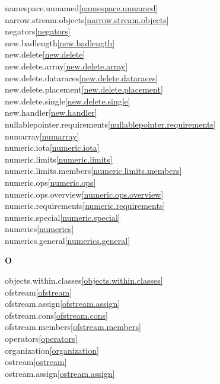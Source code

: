 \begin{multicols}{2}
namespace.unnamed\quad\ref{namespace.unnamed}\\
narrow.stream.objects\quad\ref{narrow.stream.objects}\\
negators\quad\ref{negators}\\
new.badlength\quad\ref{new.badlength}\\
new.delete\quad\ref{new.delete}\\
new.delete.array\quad\ref{new.delete.array}\\
new.delete.dataraces\quad\ref{new.delete.dataraces}\\
new.delete.placement\quad\ref{new.delete.placement}\\
new.delete.single\quad\ref{new.delete.single}\\
new.handler\quad\ref{new.handler}\\
nullablepointer.requirements\quad\ref{nullablepointer.requirements}\\
numarray\quad\ref{numarray}\\
numeric.iota\quad\ref{numeric.iota}\\
numeric.limits\quad\ref{numeric.limits}\\
numeric.limits.members\quad\ref{numeric.limits.members}\\
numeric.ops\quad\ref{numeric.ops}\\
numeric.ops.overview\quad\ref{numeric.ops.overview}\\
numeric.requirements\quad\ref{numeric.requirements}\\
numeric.special\quad\ref{numeric.special}\\
numerics\quad\ref{numerics}\\
numerics.general\quad\ref{numerics.general}\\
\par \textbf{O}\par
objects.within.classes\quad\ref{objects.within.classes}\\
ofstream\quad\ref{ofstream}\\
ofstream.assign\quad\ref{ofstream.assign}\\
ofstream.cons\quad\ref{ofstream.cons}\\
ofstream.members\quad\ref{ofstream.members}\\
operators\quad\ref{operators}\\
organization\quad\ref{organization}\\
ostream\quad\ref{ostream}\\
ostream.assign\quad\ref{ostream.assign}\\

\end{multicols}

